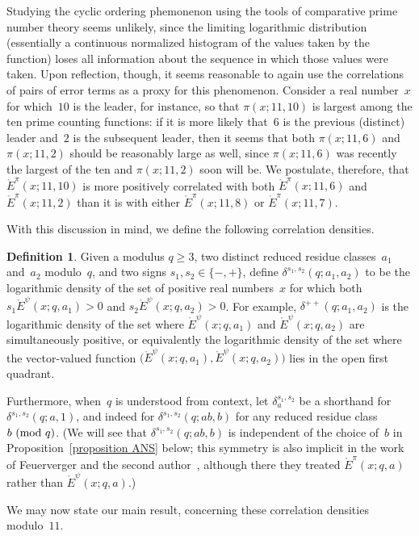\documentclass[11pt]{article}
\theoremstyle{plain}
\theoremstyle{definition}
\newtheorem{definition}[thm]{Definition}
\numberwithin{equation}{section}
\renewcommand{\mod}[1]{{\ifmmode\text{\rm\ (mod~$#1$)}\else\discretionary{}{}{\hbox{\!\!}}\rm(mod~$#1$)\fi}}
\newcommand{\Edot}{\mathord{\mathring E}}
\newcommand{\0}{{\vec 0}}
\begin{document}
Studying the cyclic ordering phemonenon using the tools of comparative prime number theory seems unlikely, since the limiting logarithmic distribution (essentially a continuous normalized histogram of the values taken by the function) loses all information about the sequence in which those values were taken. Upon reflection, though, it seems reasonable to again use the correlations of pairs of error terms as a proxy for this phenomenon. Consider a real number~$x$ for which~$10$ is the leader, for instance, so that $\pi(x;11,10)$ is largest among the ten prime counting functions: if it is more likely that~$6$ is the previous (distinct) leader and~$2$ is the subsequent leader, then it seems that both $\pi(x;11,6)$ and $\pi(x;11,2)$ should be reasonably large as well, since $\pi(x;11,6)$ was recently the largest of the ten and $\pi(x;11,2)$ soon will be. We postulate, therefore, that $\Edot^\pi(x;11,10)$ is more positively correlated with both $\Edot^\pi(x;11,6)$ and $\Edot^\pi(x;11,2)$ than it is with either $\Edot^\pi(x;11,8)$ or $\Edot^\pi(x;11,7)$.

With this discussion in mind, we define the following correlation densities.

\begin{definition}
Given a modulus $q\ge3$, two distinct reduced residue classes~$a_1$ and~$a_2$ modulo~$q$, and two signs $s_1,s_2\in\{-,+\}$, define $\delta^{s_1,s_2}(q;a_1,a_2)$ to be the logarithmic density of the set of positive real numbers~$x$ for which both $s_1 \Edot^\psi(x;q,a_1) > 0$ and $s_2 \Edot^\psi(x;q,a_2) > 0$. For example, $\delta^{++}(q;a_1,a_2)$ is the logarithmic density of the set where $\Edot^\psi(x;q,a_1)$ and $\Edot^\psi(x;q,a_2)$ are simultaneously positive, or equivalently the logarithmic density of the set where the vector-valued function $\bigl( \Edot^\psi(x;q,a_1), \Edot^\psi(x;q,a_2) \bigr)$ lies in the open first quadrant.

Furthermore, when~$q$ is understood from context, let $\delta^{s_1,s_2}_a$ be a shorthand for $\delta^{s_1,s_2}(q;a,1)$, and indeed for $\delta^{s_1,s_2}(q;ab,b)$ for any reduced residue class $b\mod q$. (We will see that $\delta^{s_1,s_2}(q;ab,b)$ is independent of the choice of~$b$ in Proposition~\ref{proposition ANS} below; this symmetry is also implicit in the work of Feuerverger and the second author~\cite[Theorem~2(b)--(c)]{BSRPNR}, although there they treated $\Edot^\pi(x;q,a)$ rather than $\Edot^\psi(x;q,a)$.)
\end{definition}

We may now state our main result, concerning these correlation densities modulo~$11$.
\end{document}
